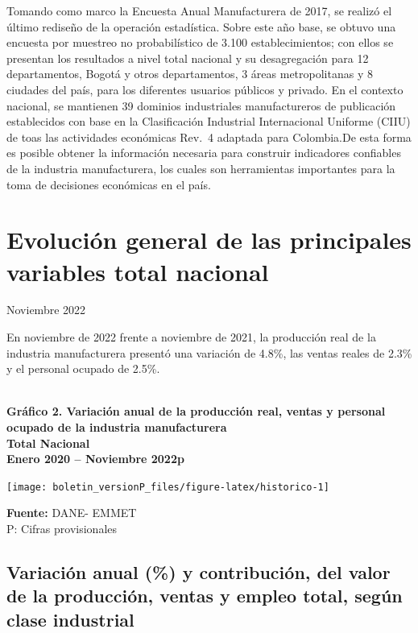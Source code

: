 \documentclass[
]{article}
\begin{document}
Tomando como marco la Encuesta Anual Manufacturera de 2017, se realizó
el último rediseño de la operación estadística. Sobre este año base, se
obtuvo una encuesta por muestreo no probabilístico de 3.100
establecimientos; con ellos se presentan los resultados a nivel total
nacional y su desagregación para 12 departamentos, Bogotá y otros
departamentos, 3 áreas metropolitanas y 8 ciudades del país, para los
diferentes usuarios públicos y privado. En el contexto nacional, se
mantienen 39 dominios industriales manufactureros de publicación
establecidos con base en la Clasificación Industrial Internacional
Uniforme (CIIU) de toas las actividades económicas Rev.~4 adaptada para
Colombia.De esta forma es posible obtener la información necesaria para
construir indicadores confiables de la industria manufacturera, los
cuales son herramientas importantes para la toma de decisiones
económicas en el país.

\newpage

\hypertarget{evoluciuxf3n-general-de-las-principales-variables-total-nacional}{%
\section{Evolución general de las principales variables total
nacional}\label{evoluciuxf3n-general-de-las-principales-variables-total-nacional}}

Noviembre 2022

En noviembre de 2022 frente a noviembre de 2021, la producción real de
la industria manufacturera presentó una variación de 4.8\%, las ventas
reales de 2.3\% y el personal ocupado de 2.5\%.\\
\strut \\
\textbf{Gráfico 2. Variación anual de la producción real, ventas y personal ocupado de la industria manufacturera}\\
\textbf{Total Nacional}\\
\textbf{Enero 2020 – Noviembre 2022p}\\

\begin{center}\texttt{[image: boletin\_versionP\_files/figure-latex/historico-1]} \end{center}

\textbf{Fuente:} DANE- EMMET\\
P: Cifras provisionales\\

\hypertarget{variaciuxf3n-anual-y-contribuciuxf3n-del-valor-de-la-producciuxf3n-ventas-y-empleo-total-seguxfan-clase-industrial}{%
\subsection{Variación anual (\%) y contribución, del valor de la
producción, ventas y empleo total, según clase
industrial}\label{variaciuxf3n-anual-y-contribuciuxf3n-del-valor-de-la-producciuxf3n-ventas-y-empleo-total-seguxfan-clase-industrial}}
\end{document}
